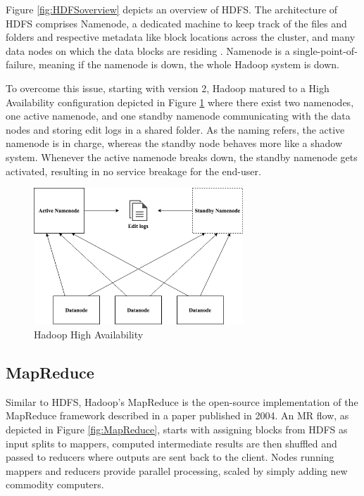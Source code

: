 \documentclass[review]{elsarticle}
\begin{document}
	Figure \ref{fig:HDFSoverview} depicts an overview of HDFS. The architecture of HDFS comprises Namenode, a dedicated machine to keep track of the files and folders and respective metadata like block locations across the cluster, and many data nodes on which the data blocks are residing \cite{white_hadoop_2015}. Namenode is a single-point-of-failure, meaning if the namenode is down, the whole Hadoop system is down. 
	
	To overcome this issue, starting with version 2, Hadoop matured to a High Availability configuration depicted in Figure \ref{fig:HadoopHA} where there exist two namenodes, one active namenode, and one standby namenode communicating with the data nodes and storing edit logs in a shared folder. As the naming refers, the active namenode is in charge, whereas the standby node behaves more like a shadow system. Whenever the active namenode breaks down, the standby namenode gets activated, resulting in no service breakage for the end-user.
	
	\begin{figure}[h!]
		\caption{Hadoop High Availability}
		\label{fig:HadoopHA}
		\includegraphics[width=0.7\textwidth]{HadoopHA}
		\centering
	\end{figure}
	
	\subsection{MapReduce}\label{MapReduce}
	Similar to HDFS, Hadoop's MapReduce is the open-source implementation of the MapReduce framework described in a paper \cite{dean_mapreduce_2004} published in 2004. An MR flow, as depicted in Figure \ref{fig:MapReduce}, starts with assigning blocks from HDFS as input splits to mappers, computed intermediate results are then shuffled and passed to reducers where outputs are sent back to the client. Nodes running mappers and reducers provide parallel processing, scaled by simply adding new commodity computers. 
	
\end{document}
